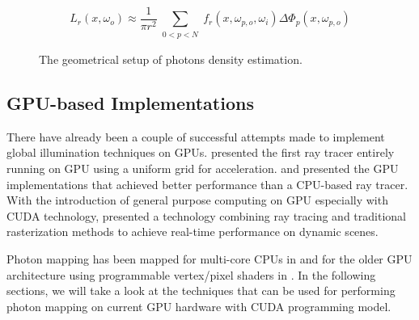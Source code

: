 \begin{equation}
L_r(x, \omega_{o}) \approx \frac{1}{\pi r^{2}}\sum_{\substack{0<p<N}}f_{r}(x, \omega_{p, o}, \omega_{i})\Delta \Phi_{p}(x,\omega_{p, o})
\label{eq:photon_estimate}
\end{equation}

\begin{figure}[ftp]
    \centering
    \renewcommand{\thefigure}{\thechapter.\arabic{figure}}
    \caption[Photon Density Estimation Model]{The geometrical setup of photons density estimation.}
    \label{fig:photon_density_estimate}
\end{figure}

\subsection{GPU-based Implementations}
There have already been a couple of successful attempts made to implement global illumination techniques on GPUs. \citeauthor{Purcell:2002:RTP:566654.566640} \cite{Purcell:2002:RTP:566654.566640} presented the first ray tracer entirely running on GPU using a uniform grid for acceleration. \cite{Horn:2007:IKT:1230100.1230129} and \cite{Popov2007} presented the GPU implementations that achieved better performance than a CPU-based ray tracer. With the introduction of general purpose computing on GPU especially with CUDA technology, \citeauthor{Luebke2008} \cite{Luebke2008} presented a technology combining ray tracing and traditional rasterization methods to achieve real-time performance on dynamic scenes.

Photon mapping has been mapped for multi-core CPUs in \cite{gunther:realtime} and for the older GPU architecture using programmable vertex/pixel shaders in \cite{Purcell:2005:PMP:1198555.1198797}. In the following sections, we will take a look at the techniques that can
be used for performing photon mapping on current GPU hardware with CUDA programming model.

